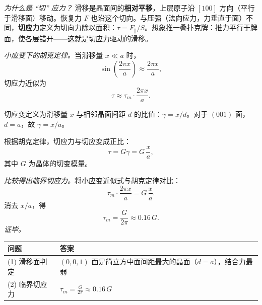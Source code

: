 \begin{derivationbox}[标准解题过程]
\textit{为什么是 ``切'' 应力？} 滑移是晶面间的\textbf{相对平移}，上层原子沿 $[100]$ 方向（平行于滑移面）移动。恢复力 $F$ 也沿这个切向。与压强（法向应力，力垂直于面）不同，\textbf{切应力}定义为切向力除以面积：$\tau = F_{\parallel}/S$。想象推一叠扑克牌：推力平行于牌面，使各层错开——这就是切应力驱动的滑移。

\textit{小应变下的胡克定律。}当滑移量 $x\ll a$ 时，
\begin{equation}
\sin\!\left(\frac{2\pi x}{a}\right) \approx \frac{2\pi x}{a},
\end{equation}
切应力近似为
\begin{equation}
\tau \approx \tau_m\cdot\frac{2\pi x}{a}.
\end{equation}

切应变定义为滑移量 $x$ 与相邻晶面间距 $d$ 的比值：$\gamma = x/d$。对于 $(001)$ 面，$d=a$，故 $\gamma = x/a$。

根据胡克定律，切应力与切应变成正比：
\begin{equation}
\tau = G\gamma = G\,\frac{x}{a},
\end{equation}
其中 $G$ 为晶体的切变模量。

\textit{比较得出临界切应力。}将小应变近似式与胡克定律对比：
\begin{equation}
\tau_m\cdot\frac{2\pi x}{a} = G\,\frac{x}{a}.
\end{equation}
消去 $x/a$，得
\begin{equation}
\boxed{\tau_m = \frac{G}{2\pi} \approx 0.16\,G.}
\end{equation}
\textit{证毕。}
\end{derivationbox}

\begin{formulabox}[答案汇总]
\begin{center}
\begin{tabular}{ll}
\toprule
\textbf{问题} & \textbf{答案} \\
\midrule
(1) 滑移面判定 & $(0,0,1)$ 面是简立方中面间距最大的晶面（$d=a$），结合力最弱 \\
(2) 临界切应力 & $\displaystyle\tau_m = \frac{G}{2\pi} \approx 0.16\,G$ \\
\bottomrule
\end{tabular}
\end{center}
\end{formulabox}

